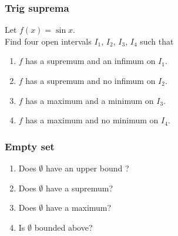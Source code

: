 \documentclass[14pt]{beamer}
\begin{document}
\begin{frame}[t]
\frametitle{Trig suprema}

Let $f(x) = \sin x$. \\
Find four open intervals $I_1$, $I_2$, $I_3$, $I_4$ such that

\begin{enumerate}
	\item  $f$ has a supremum and an infimum on $I_1$.
	\item $f$ has a supremum and no infimum on $I_2$.
	\item $f$ has a maximum and a minimum on $I_3$.
	\item $f$ has a maximum and no minimum on $I_4$.
\end{enumerate}

\end{frame}
\begin{frame}[t]
\frametitle{Empty set}

\begin{enumerate}
	\item  Does $\emptyset$ have an upper bound ?
	\item  Does $\emptyset$ have a supremum?
	\item  Does $\emptyset$ have a maximum?
	\item  Is $\emptyset$ bounded above?
\end{enumerate}

\end{frame}
\end{document}
